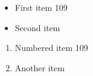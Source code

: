 \documentclass{article}
\begin{document}
\begin{itemize}
\item First item 109
\item Second item
\end{itemize}
\begin{enumerate}
\item Numbered item 109
\item Another item
\end{enumerate}
\end{document}
